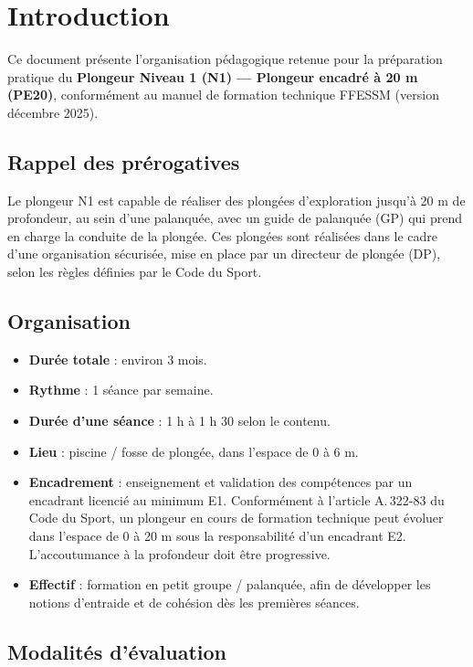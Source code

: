 \section{Introduction}

Ce document présente l'organisation pédagogique retenue pour la préparation pratique du
\textbf{Plongeur Niveau 1 (N1) --- Plongeur encadré à 20 m (PE20)}, conformément au manuel de
formation technique FFESSM (version décembre 2025).

\subsection{Rappel des prérogatives}

Le plongeur N1 est capable de réaliser des plongées d'exploration jusqu'à 20 m de profondeur,
au sein d'une palanquée, avec un guide de palanquée (GP) qui prend en charge la conduite de la
plongée. Ces plongées sont réalisées dans le cadre d'une organisation sécurisée, mise en place
par un directeur de plongée (DP), selon les règles définies par le Code du Sport.

\subsection{Organisation}

\begin{itemize}[leftmargin=1.2cm]
  \item \textbf{Durée totale} : environ 3 mois.
  \item \textbf{Rythme} : 1 séance par semaine.
  \item \textbf{Durée d'une séance} : 1 h à 1 h 30 selon le contenu.
  \item \textbf{Lieu} : piscine / fosse de plongée, dans l'espace de 0 à 6 m.
  \item \textbf{Encadrement} : enseignement et validation des compétences par un encadrant
        licencié au minimum E1. Conformément à l'article A.\,322-83 du Code du Sport, un
        plongeur en cours de formation technique peut évoluer dans l'espace de 0 à 20 m sous
        la responsabilité d'un encadrant E2. L'accoutumance à la profondeur doit être
        progressive.
  \item \textbf{Effectif} : formation en petit groupe / palanquée, afin de développer les
        notions d'entraide et de cohésion dès les premières séances.
\end{itemize}

\subsection{Modalités d'évaluation}

